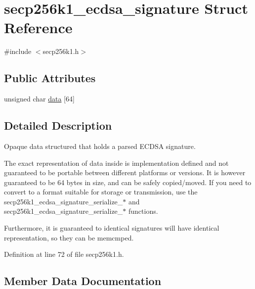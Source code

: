 \hypertarget{structsecp256k1__ecdsa__signature}{}\section{secp256k1\+\_\+ecdsa\+\_\+signature Struct Reference}
\label{structsecp256k1__ecdsa__signature}


{\ttfamily \#include $<$secp256k1.\+h$>$}

\subsection*{Public Attributes}
\begin{DoxyCompactItemize}
\item 
unsigned char \hyperlink{structsecp256k1__ecdsa__signature_a80f750e6d473a8d43c77e53757893f15}{data} \mbox{[}64\mbox{]}
\end{DoxyCompactItemize}


\subsection{Detailed Description}
Opaque data structured that holds a parsed E\+C\+D\+S\+A signature.

The exact representation of data inside is implementation defined and not guaranteed to be portable between different platforms or versions. It is however guaranteed to be 64 bytes in size, and can be safely copied/moved. If you need to convert to a format suitable for storage or transmission, use the secp256k1\+\_\+ecdsa\+\_\+signature\+\_\+serialize\+\_\+$\ast$ and secp256k1\+\_\+ecdsa\+\_\+signature\+\_\+serialize\+\_\+$\ast$ functions.

Furthermore, it is guaranteed to identical signatures will have identical representation, so they can be memcmp\textquotesingle{}ed. 

Definition at line 72 of file secp256k1.\+h.



\subsection{Member Data Documentation}
\hypertarget{structsecp256k1__ecdsa__signature_a80f750e6d473a8d43c77e53757893f15}{}

